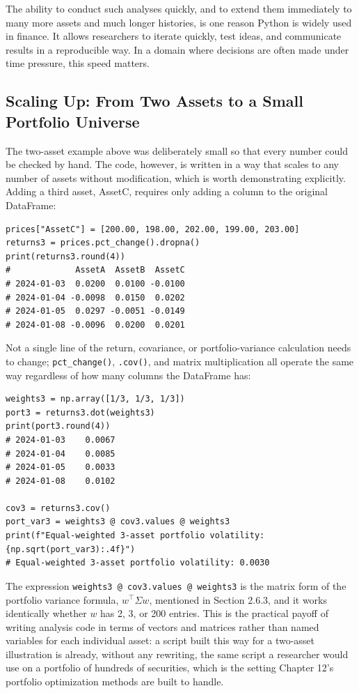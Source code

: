 \documentclass[../ai_in_finance]{subfiles}
\begin{document}
The ability to conduct such analyses quickly, and to extend them immediately to many more assets and much longer histories, is one reason Python is widely used in finance. It allows researchers to iterate quickly, test ideas, and communicate results in a reproducible way. In a domain where decisions are often made under time pressure, this speed matters.

\subsection{Scaling Up: From Two Assets to a Small Portfolio Universe}

The two-asset example above was deliberately small so that every number could be checked by hand. The code, however, is written in a way that scales to any number of assets without modification, which is worth demonstrating explicitly. Adding a third asset, AssetC, requires only adding a column to the original DataFrame:

\begin{verbatim}
prices["AssetC"] = [200.00, 198.00, 202.00, 199.00, 203.00]
returns3 = prices.pct_change().dropna()
print(returns3.round(4))
#             AssetA  AssetB  AssetC
# 2024-01-03  0.0200  0.0100 -0.0100
# 2024-01-04 -0.0098  0.0150  0.0202
# 2024-01-05  0.0297 -0.0051 -0.0149
# 2024-01-08 -0.0096  0.0200  0.0201
\end{verbatim}

Not a single line of the return, covariance, or portfolio-variance calculation needs to change; \texttt{pct\_change()}, \texttt{.cov()}, and matrix multiplication all operate the same way regardless of how many columns the DataFrame has:

\begin{verbatim}
weights3 = np.array([1/3, 1/3, 1/3])
port3 = returns3.dot(weights3)
print(port3.round(4))
# 2024-01-03    0.0067
# 2024-01-04    0.0085
# 2024-01-05    0.0033
# 2024-01-08    0.0102

cov3 = returns3.cov()
port_var3 = weights3 @ cov3.values @ weights3
print(f"Equal-weighted 3-asset portfolio volatility: {np.sqrt(port_var3):.4f}")
# Equal-weighted 3-asset portfolio volatility: 0.0030
\end{verbatim}

The expression \texttt{weights3 @ cov3.values @ weights3} is the matrix form of the portfolio variance formula, $w^\top \Sigma w$, mentioned in Section 2.6.3, and it works identically whether $w$ has 2, 3, or 200 entries. This is the practical payoff of writing analysis code in terms of vectors and matrices rather than named variables for each individual asset: a script built this way for a two-asset illustration is already, without any rewriting, the same script a researcher would use on a portfolio of hundreds of securities, which is the setting Chapter 12's portfolio optimization methods are built to handle.
\end{document}
